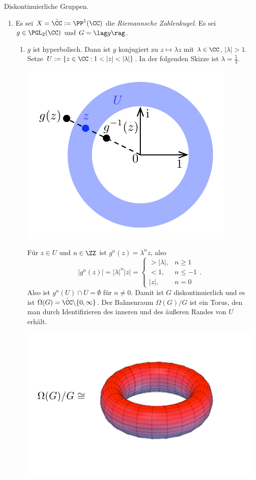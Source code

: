 \BSP Diskontinuierliche Gruppen.
\begin{enumerate}
\item Es sei $X=\hat{\CC}:=\PP^1(\CC)$ die
\emph{Riemannsche Zahlenkugel}.
Es sei $g\in\PGL_2(\CC)$ und $G=\lag g\rag$.
\begin{enumerate}
\item $g$ ist hyperbolisch.
Dann ist $g$ konjugiert zu $z\mapsto \lambda z$ mit $\lambda\in\CC$,
$|\lambda|>1$.
Setze $U:=\{z\in\CC : 1<|z|<|\lambda| \}$.
In der folgenden Skizze ist $\lambda=\frac{5}{3}$.
\begin{center}
	\includegraphics{grugraImages/UinC}
\end{center}
Für $z\in U$ und $n\in\ZZ$ ist $g^n(z)=\lambda^n z$,
also
\[
|g^n(z)|=|\lambda|^n |z|=
\left\{
\begin{matrix}
>|\lambda|, & n\geq 1 \\
< 1, & n\leq -1 \\
|z|, & n=0
\end{matrix}
\right..
\]
Also ist $g^n(U)\cap U=\emptyset$ für $n\neq 0$.
Damit ist $G$ diskontinuierlich und es ist
$\Omega(G)=\hat{\CC}\backslash\{0,\infty\}$.
Der Bahnenraum $\Omega(G)/G$ ist ein Torus, den man durch
Identifizieren des inneren und des äußeren Randes von $U$
erhält.
\begin{center}
	\includegraphics{grugraImages/Torus.pdf}

\end{center}
\end{enumerate}
\end{enumerate}
